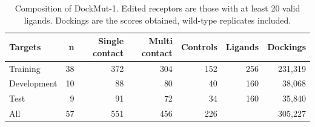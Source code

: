 \begin{table}[t]
\caption{Composition of DockMut-1. Edited receptors are those with at least 20 valid ligands. Dockings are the scores obtained, wild-type replicates included.}
\label{tab:data}
\begin{tabular}{lrrrrrr}
\toprule
Targets & n & Single contact & Multi contact & Controls & Ligands & Dockings \\
\midrule
Training & 38 & 372 & 304 & 152 & 256 & 231{,}319 \\
Development & 10 & 88 & 80 & 40 & 160 & 38{,}068 \\
Test & 9 & 91 & 72 & 34 & 160 & 35{,}840 \\
All & 57 & 551 & 456 & 226 &  & 305{,}227 \\
\bottomrule
\end{tabular}
\end{table}
